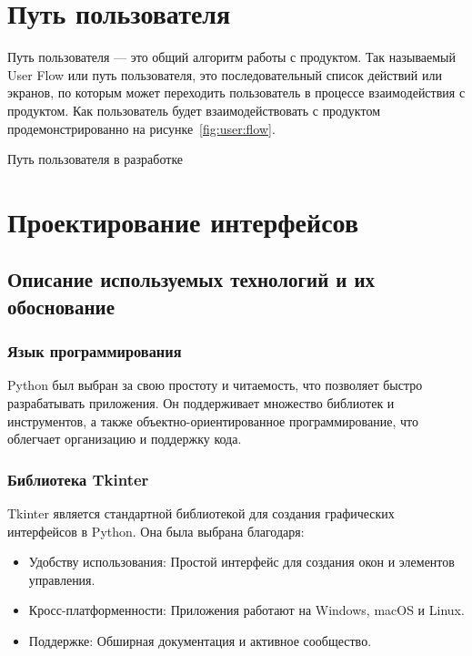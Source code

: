 \section{Путь пользователя}

Путь пользователя --- это общий алгоритм работы с продуктом. Так
называемый User Flow или путь пользователя, это последовательный
список действий или экранов, по которым может переходить
пользователь в процессе взаимодействия с продуктом.
Как пользователь будет взаимодействовать с продуктом
продемонстрированно на рисунке~\ref{fig:user:flow}.

\begin{image}
	\caption{Путь пользователя в разработке}
	\label{fig:user:flow}
\end{image}

\section{Проектирование интерфейсов}

\subsection{Описание используемых технологий и их обоснование}

\subsubsection{Язык программирования}

Python был выбран за свою простоту и читаемость,
что позволяет быстро разрабатывать приложения.
Он поддерживает множество библиотек и инструментов,
а также объектно-ориентированное программирование,
что облегчает организацию и поддержку кода.

\subsubsection{Библиотека Tkinter}

Tkinter является стандартной библиотекой
для создания графических интерфейсов в Python.
Она была выбрана благодаря:

\begin{itemize}
	\item Удобству использования:
		Простой интерфейс для создания окон и элементов управления.
	\item Кросс-платформенности:
		Приложения работают на Windows, macOS и Linux.
	\item Поддержке: Обширная документация и активное сообщество.
\end{itemize}

